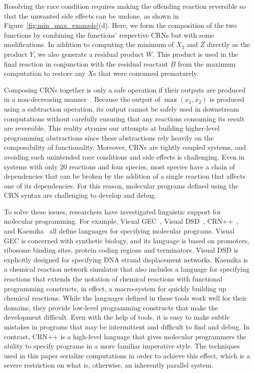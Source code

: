 Resolving the race condition requires making the offending reaction reversible so that the unwanted side effects can be undone, as shown in Figure~\ref{fig:min_max_example}(d).
Here, we form the composition of the two functions by combining the functions' respective CRNs but with some modifications.
In addition to computing the minimum of $X_3$ and $Z$ directly as the product $Y$, we also generate a residual product $W$.
This product is used in the final reaction in conjunction with the residual reactant $B$ from the maximum computation to restore any $X$s that were consumed prematurely.

Composing CRNs together is only a safe operation if their outputs are produced in a non-decreasing manner~\cite{jCKRS18,doty19}.
Because the output of \( \max(x_1, x_2) \) is produced using a subtraction operation, its output cannot be safely used in downstream computations without carefully ensuring that any reactions consuming its result are reversible.
This reality stymies our attempts at building higher-level programming abstractions since these abstractions rely heavily on the composability of functionality.
Moreover, CRNs are tightly coupled systems, and avoiding such unintended race conditions and side effects is challenging.
Even in systems with only 20 reactions and four species, most species have a chain of dependencies that can be broken by the addition of a single reaction that affects one of its dependencies.
For this reason, molecular programs defined using the CRN syntax are challenging to develop and debug.

To solve these issues, researchers have investigated linguistic support for molecular programming.
For example, Visual GEC~\cite{jPedPhi09}, Visual DSD~\cite{jLYPEP11}, CRN++~\cite{Vasic2020}, and Kaemika~\cite{cardelliKaemika} all define languages for specifying molecular programs.
Visual GEC is concerned with synthetic biology, and its language is based on promoters, ribosome binding sites, protein coding regions and terminators.
Visual DSD is explicitly designed for specifying DNA strand displacement networks.
Kaemika is a chemical reaction network simulator that also includes a language for specifying reactions that extends the notation of chemical reactions with functional programming constructs, in effect, a macro-system for quickly building up chemical reactions.
While the languages defined in these tools work well for their domains, they provide low-level programming constructs that make the development difficult.
Even with the help of tools, it is easy to make subtle mistakes in programs that may be intermittent and difficult to find and debug.
In contrast, CRN++ is a high-level language that gives molecular programmers the ability to specify programs in a more familiar imperative style.
The techniques used in this paper serialize computations in order to achieve this effect, which is a severe restriction on what is, otherwise, an inherently parallel system.

